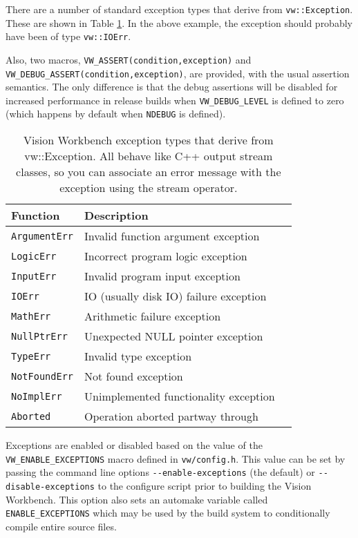 There are a number of standard exception types that derive from
\verb#vw::Exception#.  These are shown in Table
\ref{tbl:exception-types}.  In the above example, the exception should
probably have been of type \verb#vw::IOErr#.  

Also, two macros, \verb#VW_ASSERT(condition,exception)# and
\verb#VW_DEBUG_ASSERT(condition,exception)#, are provided, with the
usual assertion semantics.  The only difference is that the debug
assertions will be disabled for increased performance in release
builds when \verb#VW_DEBUG_LEVEL# is defined to zero (which happens by
default when \verb#NDEBUG# is defined).

\begin{table}[t]\begin{centering}
\begin{tabular}{|l|l|l|} \hline
Function & Description \\ \hline \hline
\verb#ArgumentErr# & Invalid function argument exception \\ \hline
\verb#LogicErr# & Incorrect program logic exception \\ \hline
\verb#InputErr# & Invalid program input exception \\ \hline
\verb#IOErr# & IO (usually disk IO) failure exception \\ \hline
\verb#MathErr# & Arithmetic failure exception \\ \hline
\verb#NullPtrErr# & Unexpected NULL pointer exception\\ \hline
\verb#TypeErr# & Invalid type exception \\ \hline
\verb#NotFoundErr# & Not found exception \\ \hline
\verb#NoImplErr# & Unimplemented functionality exception \\ \hline
\verb#Aborted# & Operation aborted partway through \\ \hline

\end{tabular}
\caption{Vision Workbench exception types that derive from
  vw::Exception.  All behave like C++ output stream classes, so you
  can associate an error message with the exception using the
  stream operator.}
\label{tbl:exception-types}
\end{centering}\end{table}

Exceptions are enabled or disabled based on the value of the
\verb#VW_ENABLE_EXCEPTIONS# macro defined in \verb#vw/config.h#.  This
value can be set by passing the command line options
\verb#--enable-exceptions# (the default) or \verb#--disable-exceptions#
to the configure script prior to building the Vision Workbench.  This
option also sets an automake variable called \verb#ENABLE_EXCEPTIONS#
which may be used by the build system to conditionally compile entire
source files.

